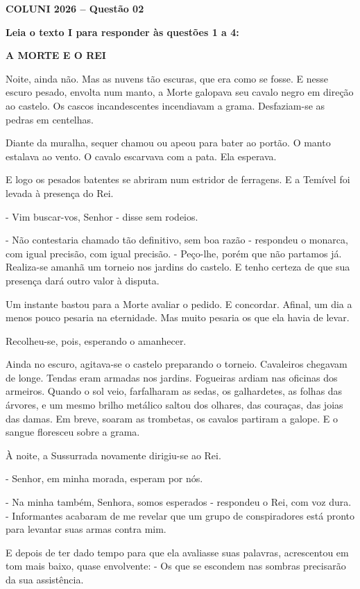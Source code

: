 \textbf{COLUNI 2026 -- Questão 02}\par\medskip \textbf{Leia o texto I para responder às questões 1 a 4:}

\begin{center}\textbf{A MORTE E O REI}\end{center}

Noite, ainda não. Mas as nuvens tão escuras, que era como se fosse. E nesse escuro pesado, envolta num manto, a Morte galopava seu cavalo negro em direção ao castelo. Os cascos incandescentes incendiavam a grama. Desfaziam-se as pedras em centelhas.

Diante da muralha, sequer chamou ou apeou para bater ao portão. O manto estalava ao vento. O cavalo escarvava com a pata. Ela esperava.

E logo os pesados batentes se abriram num estridor de ferragens. E a Temível foi levada à presença do Rei.

- Vim buscar-vos, Senhor - disse sem rodeios.

- Não contestaria chamado tão definitivo, sem boa razão - respondeu o monarca, com igual precisão, com igual precisão. - Peço-lhe, porém que não partamos já. Realiza-se amanhã um torneio nos jardins do castelo. E tenho certeza de que sua presença dará outro valor à disputa.

Um instante bastou para a Morte avaliar o pedido. E concordar. Afinal, um dia a menos pouco pesaria na eternidade. Mas muito pesaria os que ela havia de levar.

Recolheu-se, pois, esperando o amanhecer.

Ainda no escuro, agitava-se o castelo preparando o torneio. Cavaleiros chegavam de longe. Tendas eram armadas nos jardins. Fogueiras ardiam nas oficinas dos armeiros. Quando o sol veio, farfalharam as sedas, os galhardetes, as folhas das árvores, e um mesmo brilho metálico saltou dos olhares, das couraças, das joias das damas. Em breve, soaram as trombetas, os cavalos partiram a galope. E o sangue floresceu sobre a grama.

À noite, a Sussurrada novamente dirigiu-se ao Rei.

- Senhor, em minha morada, esperam por nós.

- Na minha também, Senhora, somos esperados - respondeu o Rei, com voz dura. - Informantes acabaram de me revelar que um grupo de conspiradores está pronto para levantar suas armas contra mim.

E depois de ter dado tempo para que ela avaliasse suas palavras, acrescentou em tom mais baixo, quase envolvente: - Os que se escondem nas sombras precisarão da sua assistência.

